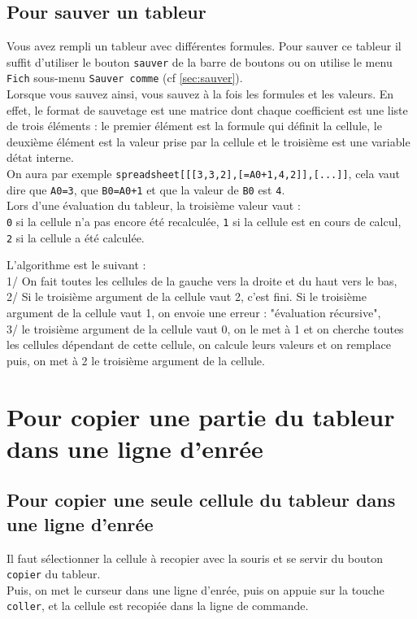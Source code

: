 \documentclass[a4paper,11pt]{book}
\begin{document}
\subsection{Pour sauver un tableur}\label{sec:sauve}
Vous avez rempli un tableur avec diff\'erentes formules. Pour sauver ce 
tableur il suffit d'utiliser le bouton {\tt sauver} de la barre de boutons ou 
on utilise le menu {\tt Fich} sous-menu {\tt Sauver comme} (cf \ref{sec:sauver}).\\
Lorsque vous sauvez ainsi, vous sauvez \`a la fois les formules et les valeurs.
En effet, le format de sauvetage est une matrice dont chaque coefficient est 
une liste de trois \'el\'ements : le premier \'el\'ement est la formule qui 
d\'efinit la cellule, le deuxi\`eme \'el\'ement est la valeur prise par la 
cellule et le troisi\`eme est une variable d\'etat interne.\\
On aura par exemple {\tt spreadsheet[[[3,3,2],[=A0+1,4,2]],[...]]},
cela vaut dire que {\tt A0=3}, que {\tt B0=A0+1} et que la valeur de 
{\tt B0} est {\tt 4}.\\
Lors d'une \'evaluation du tableur, la troisi\`eme  valeur vaut :\\ 
{\tt 0} si la cellule n'a pas encore \'et\'e recalcul\'ee,
{\tt 1} si la cellule est en cours de calcul,\\
 {\tt 2} si la cellule a \'et\'e calcul\'ee.

L'algorithme est le suivant :\\
1/ On fait toutes les cellules de la gauche vers la droite
et du haut vers le bas,\\
2/ Si le troisi\`eme argument de la cellule vaut 2, c'est fini.
Si le troisi\`eme argument de la cellule vaut 1, on envoie une erreur :
"\'evaluation r\'ecursive", \\
3/ le troisi\`eme argument de la cellule vaut 0, on le met \`a 1 et
on cherche toutes les cellules d\'ependant de cette cellule,
on calcule leurs valeurs et on remplace puis, on met \`a  2 le troisi\`eme 
argument de la cellule.
\section{Pour copier une partie du tableur dans une ligne d'enr\'ee}
\subsection{Pour copier une seule cellule du tableur dans une ligne d'enr\'ee}
Il faut s\'electionner la cellule \`a recopier avec la 
souris et se servir du bouton {\tt copier} du tableur.\\
Puis, on met le curseur dans une ligne d'enr\'ee, puis on appuie sur la touche 
{\tt coller}, et la cellule  est recopi\'ee dans la ligne de commande.
\end{document}
